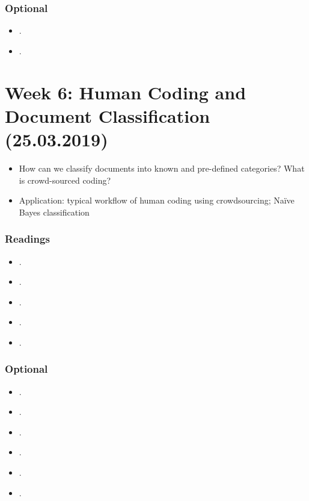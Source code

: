 \documentclass[abstract=on,parskip=full,headings=standardclasses,fontsize=11pt,paper=a4]{scrartcl}
\begin{document}
\subsubsection*{Optional}
\begin{itemize}
\item {}.
\item {}.
\end{itemize}


\section{Week 6: Human Coding and Document Classification (25.03.2019)}

\begin{itemize}
\item How can we classify documents into known and pre-defined categories? What is crowd-sourced coding?
\item Application: typical workflow of human coding using crowdsourcing; Naïve Bayes classification
\end{itemize}

\subsubsection*{Readings}
\begin{itemize}
\item {}.
\item {}.
\item {}.
\item {}.
\item {}.
\end{itemize}

\subsubsection*{Optional}
\begin{itemize}
\item {}.
\item {}.
\item {}.
\item {}.
\item {}.
\item {}.
\end{itemize}
\end{document}
